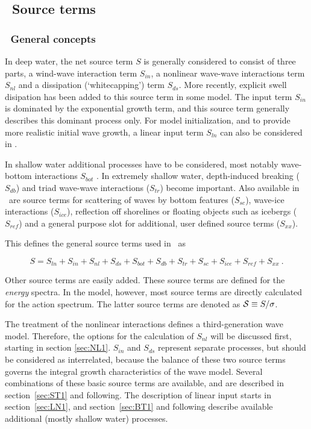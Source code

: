 \vssub
\subsection{~Source terms}
\vsssub
\subsubsection{~General concepts}
\vsssub

In deep water, the net source term $S$ is generally considered to consist of
three parts, a wind-wave interaction term $S_{in}$, a nonlinear wave-wave
interactions term $S_{nl}$ and a dissipation (`whitecapping') term
$S_{ds}$. More recently, explicit swell disipation has been added to this
source term in some model.  The input term $S_{in}$ is dominated by the
exponential growth term, and this source term generally describes this
dominant process only. For model initialization, and to provide more realistic
initial wave growth, a linear input term $S_{ln}$ can also be considered in
\ws.

In shallow water additional processes have to be considered, most notably
wave-bottom interactions $S_{bot}$ \cite[e.g.,][]{pro:Sea78}. In extremely
shallow water, depth-induced breaking ($S_{db}$) and triad wave-wave
interactions ($S_{tr}$) become important. Also available in \ws\ are source
terms for scattering of waves by bottom features ($S_{sc}$), wave-ice
interactions ($S_{ice}$), reflection off shorelines or floating objects such
as icebergs ($S_{ref}$) and a general purpose slot for additional, user
defined source terms ($S_{xx}$).

This defines the general source terms used in \ws\ as


\begin{equation}
S = S_{ln} + S_{in} + S_{nl} + S_{ds} + S_{bot} + S_{db} + S_{tr} +
    S_{sc} + S_{ice} + S_{ref} + S_{xx}\: .
\label{eq:general_st}
\end{equation}

\noindent
Other source terms are easily added. These source terms are defined for the
{\em energy} spectra. In the model, however, most source terms are directly
calculated for the action spectrum. The latter source terms are denoted as
${\cal S} \equiv S/\sigma$.

The treatment of the nonlinear interactions defines a third-generation wave
model. Therefore, the options for the calculation of $S_{nl}$ will be
discussed first, starting in section \ref{sec:NL1}. $S_{in}$ and $S_{ds}$
represent separate processes, but should be considered as interrelated,
because the balance of these two source terms governs the integral growth
characteristics of the wave model. Several combinations of these basic source
terms are available, and are described in section~\ref{sec:ST1} and following.
The description of linear input starts in section~\ref{sec:LN1}, and
section~\ref{sec:BT1} and following describe available additional (mostly
shallow water) processes.

